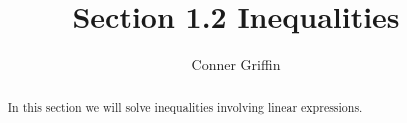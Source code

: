 \documentclass{ximera}
\title{Section 1.2 Inequalities}
\author{Conner Griffin}
\begin{document}
\begin{abstract}
    In this section we will solve inequalities involving linear expressions.
\end{abstract}
\maketitle








%
\end{document}
